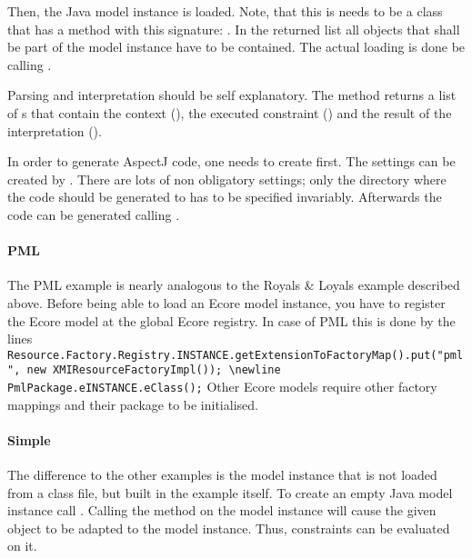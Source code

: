Then, the Java model instance is loaded. Note, that this is needs to be a class that has a method with this signature: . In the returned list all objects that shall be part of the model instance have to be contained. The actual loading is done be calling .

Parsing and interpretation should be self explanatory. The method  returns a list of s that contain the context (), the executed constraint () and the result of the interpretation ().

In order to generate AspectJ code, one needs to create  first. The settings can be created by . There are lots of non obligatory settings; only the directory where the code should be generated to has to be specified invariably. Afterwards the code can be generated calling .

\paragraph{PML}
\lstset{language=Java}
The PML example is nearly analogous to the Royals \& Loyals example described above. Before being able to load an Ecore model instance, you have to register the Ecore model at the global Ecore registry. In case of PML this is done by the lines \lstinline[breaklines=true]{Resource.Factory.Registry.INSTANCE.getExtensionToFactoryMap().put("pml", new XMIResourceFactoryImpl()); \newline PmlPackage.eINSTANCE.eClass();} Other Ecore models require other factory mappings and their package to be initialised.

\paragraph{Simple}
The difference to the other examples is the model instance that is not loaded from a class file, but built in the example itself. To create an empty Java model instance call . Calling the method  on the model instance will cause the given object to be adapted to the model instance. Thus, constraints can be evaluated on it.


